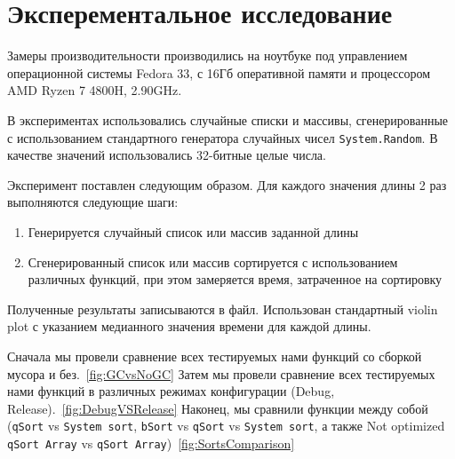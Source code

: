 \section{Эксперементальное исследование}

Замеры производительности производились на ноутбуке под управлением операционной системы Fedora 33, с 16Гб оперативной памяти и процессором AMD Ryzen 7 4800H, 2.90GHz.  

В экспериментах использовались случайные списки и массивы, сгенерированные с использованием стандартного генератора случайных чисел \verb|System.Random|.
В качестве значений использовались 32-битные целые числа.

Эксперимент поставлен следующим образом. 
Для каждого значения длины 2 раз выполняются следующие шаги:
\begin{enumerate}
  \item Генерируется случайный список или массив заданной длины
  \item Сгенерированный список или массив сортируется с использованием различных функций, при этом замеряется время, затраченное на сортировку 
\end{enumerate}

Полученные результаты записываются в файл.
Использован стандартный violin plot с указанием медианного значения времени для каждой длины.

Сначала мы провели сравнение всех тестируемых нами функций со сборкой мусора и без.~\ref{fig:GCvsNoGC}
Затем мы провели сравнение всех тестируемых нами функций в различных режимах конфигурации (Debug, Release).~\ref{fig:DebugVSRelease}
Наконец, мы сравнили функции между собой (\verb|qSort| vs \verb|System sort|, \verb|bSort| vs \verb|qSort| vs \verb|System sort|, а также Not optimized \verb|qSort Array| vs \verb|qSort Array|)~\ref{fig:SortsComparison}

